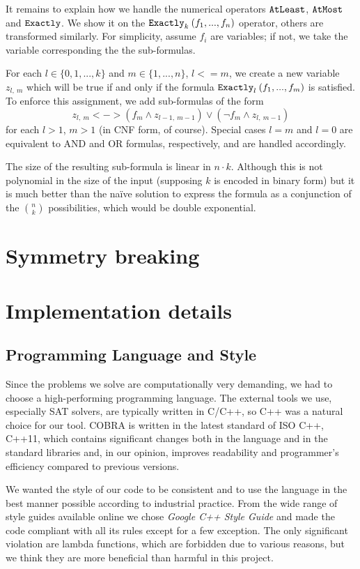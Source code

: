 It remains to explain how we handle the numerical operators
  $\mathtt{AtLeast}$, $\mathtt{AtMost}$ and $\mathtt{Exactly}$.
We show it on the $\mathtt{Exactly}_{k}\:(f_1, ..., f_n)$ operator,
  others are transformed similarly. For simplicity,
  assume $f_i$ are variables; if not, we take the variable corresponding the
  the sub-formulas.

For each $l\in\{0,1,...,k\}$ and $m\in\{1,...,n\}$, $l <= m$, we create
  a new variable $z_{l,\:m}$ which will be true if and only if
  the formula $\mathtt{Exactly}_{l}\:(f_1, ..., f_m)$ is satisfied.
To enforce this assignment, we add sub-formulas of the form
  \[ z_{l,\:m} <-> (f_m \wedge z_{l-1,\:m-1}) \vee (\neg f_m \wedge z_{l,\:m-1}) \]
  for each $l > 1$, $m > 1$ (in CNF form, of course).
Special cases $l = m$ and $l = 0$ are equivalent to AND and OR formulas, respectively,
  and are handled accordingly.

The size of the resulting sub-formula is linear in $n\cdot k$.
Although this is not polynomial in the size of the input
  (supposing $k$ is encoded in binary form) but it is much better
  than the na\"ive solution to express the formula
  as a conjunction of the $n\choose k$ possibilities,
  which would be double exponential.

\section{Symmetry breaking}

\section{Implementation details}

\subsection{Programming Language and Style}

Since the problems we solve are computationally very demanding,
  we had to choose a high-performing programming language.
The external tools we use, especially SAT solvers, are typically written in C/C++,
  so C++ was a natural choice for our tool.
COBRA is written in the latest standard of ISO C++, C++11, which
  contains significant changes both in the language and in the standard libraries
  and, in our opinion, improves readability and programmer's efficiency
  compared to previous versions.

We wanted the style of our code to be consistent and to use
  the language in the best manner possible according to industrial practice.
From the wide range of style guides available online
 we chose \emph{Google C++ Style Guide}\cite{googlestyle} and made
 the code compliant with all its rules except for a few exception.
The only significant violation are lambda functions, which are forbidden
due to various reasons,
 but we think they are more beneficial than harmful in this project.

